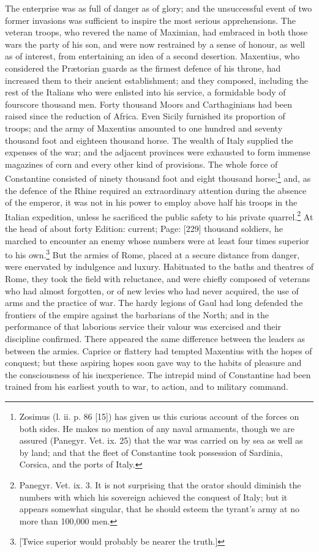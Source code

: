 The enterprise was as full of danger as of glory; and the unsuccessful event of two former invasions was sufficient to inspire the most serious apprehensions. The veteran troops, who revered the name of Maximian, had embraced in both those wars the party of his son, and were now restrained by a sense of honour, as well as of interest, from entertaining an idea of a second desertion. Maxentius, who considered the Prætorian guards as the firmest defence of his throne, had increased them to their ancient establishment; and they composed, including the rest of the Italians who were enlisted into his service, a formidable body of fourscore thousand men. Forty thousand Moors and Carthaginians had been raised since the reduction of Africa. Even Sicily furnished its proportion of troops; and the army of Maxentius amounted to one hundred and seventy thousand foot and eighteen thousand horse. The wealth of Italy supplied the expenses of the war; and the adjacent provinces were exhausted to form immense magazines of corn and every other kind of provisions. The whole force of Constantine consisted of ninety thousand foot and eight thousand horse;\footnote{Zosimus (l. ii. p. 86 [15]) has given us this curious account of the forces on both sides. He makes no mention of any naval armaments, though we are assured (Panegyr. Vet. ix. 25) that the war was carried on by sea as well as by land; and that the fleet of Constantine took possession of Sardinia, Corsica, and the ports of Italy.} and, as the defence of the Rhine required an extraordinary attention during the absence of the emperor, it was not in his power to employ above half his troops in the Italian expedition, unless he sacrificed the public safety to his private quarrel.\footnote{Panegyr. Vet. ix. 3. It is not surprising that the orator should diminish the numbers with which his sovereign achieved the conquest of Italy; but it appears somewhat singular, that he should esteem the tyrant\texthebrew{}’s army at no more than 100,000 men.} At the head of about forty Edition: current; Page: [229] thousand soldiers, he marched to encounter an enemy whose numbers were at least four times superior to his own.\footnote{[Twice superior would probably be nearer the truth.]} But the armies of Rome, placed at a secure distance from danger, were enervated by indulgence and luxury. Habituated to the baths and theatres of Rome, they took the field with reluctance, and were chiefly composed of veterans who had almost forgotten, or of new levies who had never acquired, the use of arms and the practice of war. The hardy legions of Gaul had long defended the frontiers of the empire against the barbarians of the North; and in the performance of that laborious service their valour was exercised and their discipline confirmed. There appeared the same difference between the leaders as between the armies. Caprice or flattery had tempted Maxentius with the hopes of conquest; but these aspiring hopes soon gave way to the habits of pleasure and the consciousness of his inexperience. The intrepid mind of Constantine had been trained from his earliest youth to war, to action, and to military command.

